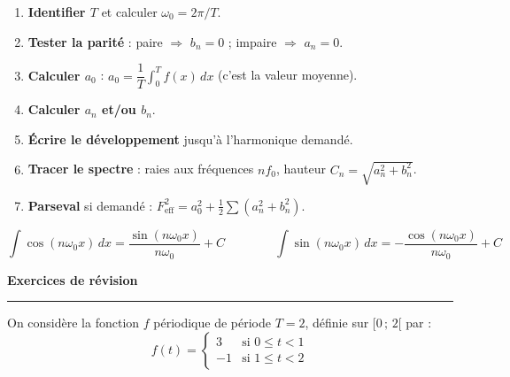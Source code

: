 \documentclass[a4paper,11pt]{article}
\newcommand{\w}{\omega_0}
\begin{document}
\vspace{0.2cm}

\begin{tcolorbox}[exobox={6 — Démarche type pour le contrôle}]
\begin{enumerate}[leftmargin=*,label=\textbf{\arabic*.},nosep]
  \item \textbf{Identifier $T$} et calculer $\omega_0 = 2\pi/T$.
  \item \textbf{Tester la parité} : paire $\Rightarrow$ $b_n=0$ ; impaire $\Rightarrow$ $a_n=0$.
  \item \textbf{Calculer $a_0$} : $a_0 = \dfrac{1}{T}\displaystyle\int_0^T f(x)\,dx$ (c'est la valeur moyenne).
  \item \textbf{Calculer $a_n$ et/ou $b_n$}.
  \item \textbf{Écrire le développement} jusqu'à l'harmonique demandé.
  \item \textbf{Tracer le spectre} : raies aux fréquences $nf_0$, hauteur $C_n=\sqrt{a_n^2+b_n^2}$.
  \item \textbf{Parseval} si demandé : $F_\mathrm{eff}^2 = a_0^2 + \frac{1}{2}\sum(a_n^2+b_n^2)$.
\end{enumerate}
\end{tcolorbox}

\vspace{0.2cm}

\begin{tcolorbox}[formulebox={7 — Formulaire — Intégrales utiles}]
\[
  \int \cos(n\w x)\,dx = \frac{\sin(n\w x)}{n\w} + C
  \qquad\qquad
  \int \sin(n\w x)\,dx = -\frac{\cos(n\w x)}{n\w} + C
\]
\end{tcolorbox}

\newpage

\begin{center}
  {\LARGE \textbf{Exercices de révision}} \\[0.2cm]
  \rule{0.5\textwidth}{0.4pt}
\end{center}

\vspace{0.4cm}

\begin{tcolorbox}[exobox={Exercice 1 — Calcul des coefficients (cas général)}]
On considère la fonction $f$ périodique de période $T = 2$, définie sur $[0\,;\,2[$ par :
\[
  f(t) = \begin{cases} 3 & \text{si } 0 \leq t < 1 \\ -1 & \text{si } 1 \leq t < 2 \end{cases}
\]
\end{tcolorbox}
\end{document}
